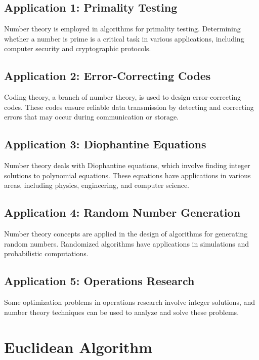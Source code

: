 \documentclass{article}
\begin{document}
\subsection{Application 1: Primality Testing}

Number theory is employed in algorithms for primality testing. Determining whether a number is prime is a critical task in various applications, including computer security and cryptographic protocols.

\subsection{Application 2: Error-Correcting Codes}

Coding theory, a branch of number theory, is used to design error-correcting codes. These codes ensure reliable data transmission by detecting and correcting errors that may occur during communication or storage.

\subsection{Application 3: Diophantine Equations}

Number theory deals with Diophantine equations, which involve finding integer solutions to polynomial equations. These equations have applications in various areas, including physics, engineering, and computer science.

\subsection{Application 4: Random Number Generation}

Number theory concepts are applied in the design of algorithms for generating random numbers. Randomized algorithms have applications in simulations and probabilistic computations.

\subsection{Application 5: Operations Research}

Some optimization problems in operations research involve integer solutions, and number theory techniques can be used to analyze and solve these problems.

\section{Euclidean Algorithm}
\end{document}
